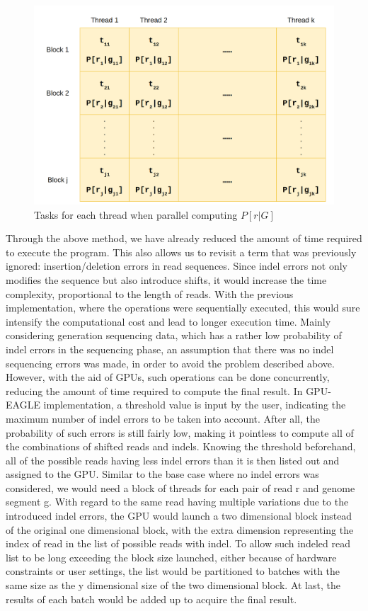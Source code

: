 \documentclass{PHlab-thesis}
\begin{document}
\begin{figure}
	\centering
	\includegraphics[scale=0.3]{figures/threadview.png}
	\caption{Tasks for each thread when parallel computing $P[r|G]$}
	\label{fig:tv} %
\end{figure}

Through the above method, we have already reduced the amount of time required to execute the program. This also allows us to revisit a term that was previously ignored: insertion/deletion errors in read sequences. Since indel errors not only modifies the sequence but also introduce shifts, it would increase the time complexity, proportional to the length of reads. With the previous implementation, where the operations were sequentially executed, this would sure intensify the computational cost and lead to longer execution time. Mainly considering generation sequencing data, which has a rather low probability of indel errors in the sequencing phase, an assumption that there was no indel sequencing errors was made, in order to avoid the problem described above. However, with the aid of GPUs, such operations can be done concurrently, reducing the amount of time required to compute the final result. In GPU-EAGLE implementation, a threshold value is input by the user, indicating the maximum number of indel errors to be taken into account. After all, the probability of such errors is still fairly low, making it pointless to compute all of the combinations of shifted reads and indels. Knowing the threshold beforehand, all of the possible reads having less indel errors than it is then listed out and assigned to the GPU. Similar to the base case where no indel errors was considered, we would need a block of threads for each pair of read r and genome segment g. With regard to the same read having multiple variations due to the introduced indel errors, the GPU would launch a two dimensional block instead of the original one dimensional block, with the extra dimension representing the index of read in the list of possible reads with indel. To allow such indeled read list to be long exceeding the block size launched, either because of hardware constraints or user settings, the list would be partitioned to batches with the same size as the y dimensional size of the two dimensional block. At last, the results of each batch would be added up to acquire the final result.
\end{document}
